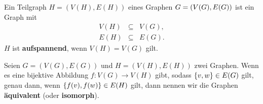 	\begin{definition}[Teilgraph]
		Ein Teilgraph $H = (V(H), E(H))$ eines Graphen $G =\\ (V(G), E(G))$ ist ein Graph mit
		\begin{eqnarray*}
			V(H) &\subseteq& V(G),\\
			E(H) &\subseteq& E(G).
		\end{eqnarray*}
		$H$ ist \textbf{aufspannend}, wenn $V(H) = V(G)$ gilt.
	\end{definition}
	\begin{definition}[Isomorph]
		Seien $G = (V(G), E(G))$ und $H = (V(H), E(H))$ zwei Graphen. Wenn es eine bijektive Abbildung $f : V(G) \to V(H)$ gibt, sodass $\{v, w\} \in E(G)$ gilt, genau dann, wenn $\{f(v), f(w)\} \in E(H)$ gilt, dann nennen wir die Graphen \textbf{äquivalent} (oder \textbf{isomorph}).
	\end{definition}
	
